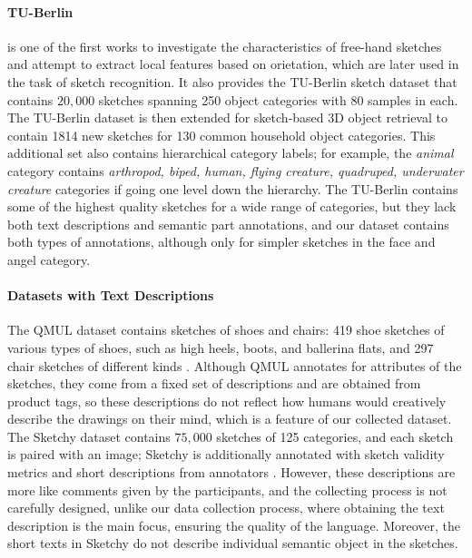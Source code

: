 \paragraph{TU-Berlin}
\citet{eitz2012hdhso} is one of the first works to investigate the characteristics of free-hand sketches and attempt to extract local features based on orietation, which are later used in the task of sketch recognition. It also provides the TU-Berlin sketch dataset that contains $20,000$ sketches spanning 250 object categories with 80 samples in each. The TU-Berlin dataset is then extended for sketch-based 3D object retrieval to contain 1814 new sketches for 130 common household object categories. This additional set also contains hierarchical category labels; for example, the \textit{animal} category contains \textit{arthropod, biped, human, flying creature, quadruped, underwater creature} categories if going one level down the hierarchy. The TU-Berlin contains some of the highest quality sketches for a wide range of categories, but they lack both text descriptions and semantic part annotations, and our dataset contains both types of annotations, although only for simpler sketches in the face and angel category.    

\paragraph{Datasets with Text Descriptions}
The QMUL dataset contains sketches of shoes and chairs: 419 shoe sketches of various types of shoes, such as high heels, boots, and ballerina flats, and 297 chair sketches of different kinds \citep{qmulDataset}. Although QMUL annotates for attributes of the sketches, they come from a fixed set of descriptions and are obtained from product tags, so these descriptions do not reflect how humans would creatively describe the drawings on their mind, which is a feature of our collected dataset.    
The Sketchy dataset contains $75,000$ sketches of 125 categories, and each sketch is paired with an image; Sketchy is additionally annotated with sketch validity metrics and short descriptions from annotators \citep{sketchyDataset}. However, these descriptions are more like comments given by the participants, and the collecting process is not carefully designed, unlike our data collection process, where obtaining the text description is the main focus, ensuring the quality of the language. Moreover, the short texts in Sketchy do not describe individual semantic object in the sketches.     

